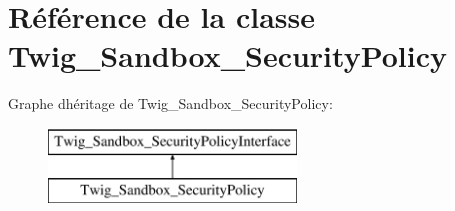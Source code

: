 \hypertarget{class_twig___sandbox___security_policy}{}\section{Référence de la classe Twig\+\_\+\+Sandbox\+\_\+\+Security\+Policy}
\label{class_twig___sandbox___security_policy}
Graphe d\textquotesingle{}héritage de Twig\+\_\+\+Sandbox\+\_\+\+Security\+Policy\+:\begin{figure}[H]
\begin{center}
\leavevmode
\includegraphics[height=2.000000cm]{class_twig___sandbox___security_policy}
\end{center}
\end{figure}
